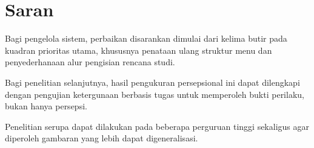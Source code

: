 \section{Saran}

\begin{daftarnomor}
    \item Bagi pengelola sistem, perbaikan disarankan dimulai dari kelima butir
          pada kuadran prioritas utama, khususnya penataan ulang struktur menu
          dan penyederhanaan alur pengisian rencana studi.
    \item Bagi penelitian selanjutnya, hasil pengukuran persepsional ini dapat
          dilengkapi dengan pengujian ketergunaan berbasis tugas untuk
          memperoleh bukti perilaku, bukan hanya persepsi.
    \item Penelitian serupa dapat dilakukan pada beberapa perguruan tinggi
          sekaligus agar diperoleh gambaran yang lebih dapat digeneralisasi.
\end{daftarnomor}
